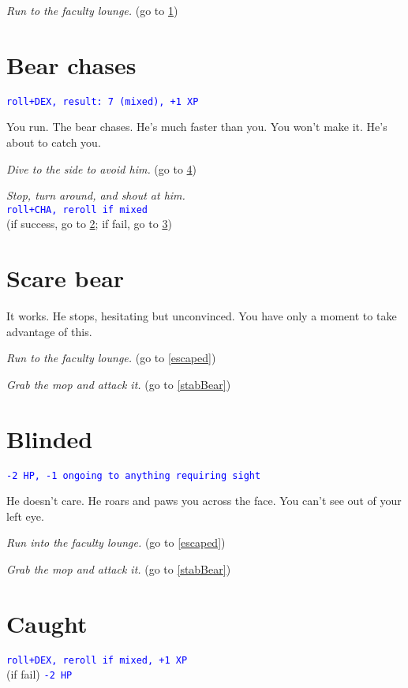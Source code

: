 \documentclass[12pt]{article}
\begin{document}
\textit{Run to the faculty lounge.} (go to \ref{bearChases})

\section{Bear chases}\label{bearChases}

\textcolor{blue}{\texttt{roll+DEX, result:~7 (mixed), +1 XP}}

You run. The bear chases. He's much faster than you. You won't make it. He's about to catch you.

\textit{Dive to the side to avoid him.} (go to \ref{caught})

\textit{Stop, turn around, and shout at him.}\\
\textcolor{blue}{\texttt{roll+CHA, reroll if mixed}}\\
(if success, go to \ref{scareBear}; if fail, go to \ref{blinded})

\section{Scare bear}\label{scareBear}

It works. He stops, hesitating but unconvinced. You have only a moment to take advantage of this.

\textit{Run to the faculty lounge.} (go to \ref{escaped})

\textit{Grab the mop and attack it.} (go to \ref{stabBear})

\section{Blinded}\label{blinded}

\textcolor{blue}{\texttt{-2 HP, -1 ongoing to anything requiring sight}}

He doesn't care. He roars and paws you across the face. You can't see out of your left eye.

\textit{Run into the faculty lounge.} (go to \ref{escaped})

\textit{Grab the mop and attack it.} (go to \ref{stabBear})

\section{Caught}\label{caught}

\textcolor{blue}{\texttt{roll+DEX, reroll if mixed, +1 XP}}\\
(if fail) \textcolor{blue}{\texttt{-2 HP}}
\end{document}
